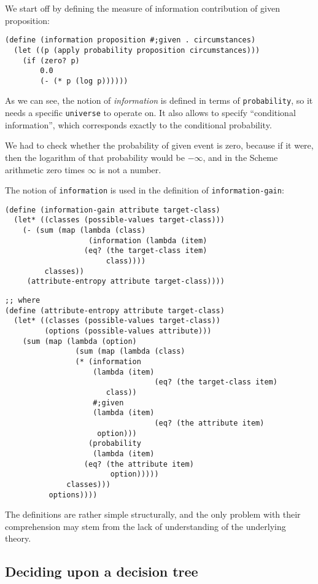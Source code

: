 We start off by defining the measure of information
contribution of given proposition:

\begin{Verbatim}[samepage=true]
(define (information proposition #;given . circumstances)
  (let ((p (apply probability proposition circumstances)))
    (if (zero? p)
        0.0
        (- (* p (log p))))))
\end{Verbatim}

As we can see, the notion of \textit{information} is defined
in terms of \texttt{probability}, so it needs a specific
\texttt{universe} to operate on. It also allows to specify
``conditional information'', which corresponds exactly to
the conditional probability.

We had to check whether the probability of given event is
zero, because if it were, then the logarithm of that probability
would be $-\infty$, and in the Scheme arithmetic zero times
$\infty$ is not a number.

The notion of \texttt{information} is used in the definition
of \texttt{information-gain}:

\begin{Verbatim}[samepage=true]
(define (information-gain attribute target-class)
  (let* ((classes (possible-values target-class)))
    (- (sum (map (lambda (class)
                   (information (lambda (item)
				  (eq? (the target-class item)
				       class))))
		 classes))
	 (attribute-entropy attribute target-class))))
\end{Verbatim}
\begin{Verbatim}[samepage=true]
;; where
(define (attribute-entropy attribute target-class)
  (let* ((classes (possible-values target-class))
         (options (possible-values attribute)))
    (sum (map (lambda (option)
                (sum (map (lambda (class)
			    (* (information
			        (lambda (item)
                                  (eq? (the target-class item)
				       class))
			        #;given
			        (lambda (item)
                                  (eq? (the attribute item)
				     option)))
			       (probability
			        (lambda (item)
				  (eq? (the attribute item)
				        option)))))
			  classes)))
	      options))))
\end{Verbatim}
The definitions are rather simple structurally, and the
only problem with their comprehension may stem from the
lack of understanding of the underlying theory.

\subsection{Deciding upon a decision tree}

